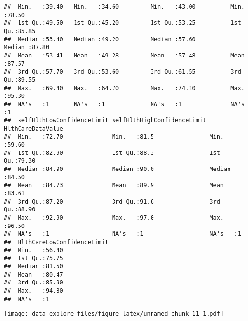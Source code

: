 \documentclass[
]{article}
\newenvironment{Shaded}{\begin{snugshade}}{\end{snugshade}}
\newcommand{\AttributeTok}[1]{\textcolor[rgb]{0.77,0.63,0.00}{#1}}
\newcommand{\FunctionTok}[1]{\textcolor[rgb]{0.00,0.00,0.00}{#1}}
\newcommand{\NormalTok}[1]{#1}
\newcommand{\SpecialCharTok}[1]{\textcolor[rgb]{0.00,0.00,0.00}{#1}}
\newcommand{\StringTok}[1]{\textcolor[rgb]{0.31,0.60,0.02}{#1}}
\begin{document}
\begin{verbatim}
##  Min.   :39.40   Min.   :34.60         Min.   :43.00          Min.   :78.50    
##  1st Qu.:49.50   1st Qu.:45.20         1st Qu.:53.25          1st Qu.:85.85    
##  Median :53.40   Median :49.20         Median :57.60          Median :87.80    
##  Mean   :53.41   Mean   :49.28         Mean   :57.48          Mean   :87.57    
##  3rd Qu.:57.70   3rd Qu.:53.60         3rd Qu.:61.55          3rd Qu.:89.55    
##  Max.   :69.40   Max.   :64.70         Max.   :74.10          Max.   :95.30    
##  NA's   :1       NA's   :1             NA's   :1              NA's   :1        
##  selfHlthLowConfidenceLimit selfHlthHighConfidenceLimit HlthCareDataValue
##  Min.   :72.70              Min.   :81.5                Min.   :59.60    
##  1st Qu.:82.90              1st Qu.:88.3                1st Qu.:79.30    
##  Median :84.90              Median :90.0                Median :84.50    
##  Mean   :84.73              Mean   :89.9                Mean   :83.61    
##  3rd Qu.:87.20              3rd Qu.:91.6                3rd Qu.:88.90    
##  Max.   :92.90              Max.   :97.0                Max.   :96.50    
##  NA's   :1                  NA's   :1                   NA's   :1        
##  HlthCareLowConfidenceLimit
##  Min.   :56.40             
##  1st Qu.:75.75             
##  Median :81.50             
##  Mean   :80.47             
##  3rd Qu.:85.90             
##  Max.   :94.80             
##  NA's   :1
\end{verbatim}

\begin{Shaded}
\end{Shaded}

\texttt{[image: data\_explore\_files/figure-latex/unnamed-chunk-11-1.pdf]}

\begin{Shaded}
\end{Shaded}
\end{document}

